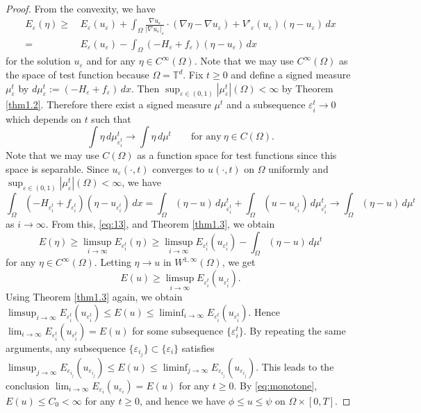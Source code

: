 \documentclass{amsart}
\theoremstyle{definition}
\begin{document}
\begin{proof}
From the convexity, we have
\begin{equation}\label{eq:13}
\begin{split}
E_\varepsilon (\eta)
\geq & \,
E_\varepsilon (u_\varepsilon)
+ \int_{\Omega} \frac{\nabla u_\varepsilon}{|\nabla u_\varepsilon|_\varepsilon }
\cdot (\nabla \eta -\nabla u_\varepsilon)
+V' _\varepsilon (u_\varepsilon) (\eta -u_\varepsilon) \, dx \\
=& \,
E_\varepsilon (u_\varepsilon)
- \int_{\Omega} (-H_\varepsilon +f_\varepsilon ) (\eta -u_\varepsilon) \, dx
\end{split}
\end{equation}
for the solution $u_\varepsilon$ and for any $\eta \in C^\infty (\Omega)$.
Note that we may use $C^\infty (\Omega)$ as the space of test function because $\Omega =\mathbb{T}^d$.
Fix $t\geq 0$ and define a signed measure $\mu_\varepsilon ^t$
by $d\mu_\varepsilon ^t := (-H_\varepsilon +f_\varepsilon) \, dx$. Then $\sup_{\varepsilon \in (0,1)} |\mu_\varepsilon ^t|(\Omega) <\infty$ by Theorem \ref{thm1.2}.
Therefore there exist a signed measure $\mu ^t$
and a subsequence $\varepsilon_i ^t \to 0$ 
which depends on $t$ such that 
\[
\int \eta \, d\mu_{\varepsilon_i ^t} ^t 
\to \int \eta \, d\mu ^t
\qquad 
\text{for any} \ \eta \in C(\Omega).
\]
Note that we may use $C(\Omega)$ 
as a function space for test functions since this space is separable.
Since $u_\varepsilon (\cdot,t)$ converges to $u (\cdot,t)$ on $\Omega$ uniformly and 
$\sup_{\varepsilon \in (0,1)} |\mu_\varepsilon ^t|(\Omega) <\infty$, 
we have
\[
\int_{\Omega} (-H_{\varepsilon_i ^t} +f_{\varepsilon_i ^t} ) (\eta -u_{\varepsilon_i ^t}) \, dx
=
\int_{\Omega} (\eta -u) \, d\mu_{\varepsilon_i ^t} ^t
+
\int_{\Omega} (u-u_{\varepsilon_i ^t}) \, d\mu_{\varepsilon_i ^t} ^t
\to 
\int_{\Omega} (\eta -u) \, d\mu ^t
\]
as $i \to \infty$. From this, \eqref{eq:13}, and Theorem \ref{thm1.3}, we obtain
\[
E (\eta) \geq \limsup_{i\to \infty} E_{\varepsilon_i ^t } (\eta)
\geq \limsup_{i\to \infty} E_{\varepsilon_i ^t} (u_{\varepsilon_i ^t})
-\int_\Omega (\eta -u) \, d\mu^t
\]
for any $\eta \in C^\infty (\Omega)$.
Letting $\eta \to u$ in $W^{1,\infty}(\Omega)$, 
we get 
\[
E(u) \geq \limsup_{i\to \infty} E_{\varepsilon_i ^t} (u_{\varepsilon_i ^t}).
\]
Using Theorem \ref{thm1.3} again, we obtain
$\limsup_{i\to \infty} E_{\varepsilon_i ^t} (u_{\varepsilon_i ^t})\leq E(u) \leq \liminf_{i\to \infty} E_{\varepsilon_i ^t} (u_{\varepsilon_i ^t})$. Hence
$\lim_{i\to \infty} E_{\varepsilon_i ^t} (u_{\varepsilon_i ^t}) =E (u)$ for some subsequence $\{\varepsilon_i ^t\}$.
By repeating the same arguments, any subsequence $\{ \varepsilon _{i_j} \} \subset \{ \varepsilon_i \}$ satisfies
$\limsup_{j\to \infty} E_{\varepsilon_{i_j} } (u_{\varepsilon_{i_j}})\leq E(u) \leq \liminf_{j\to \infty} E_{\varepsilon_{i_j}} (u_{\varepsilon_{i_j}})$. 
This leads to the conclusion $\lim_{i\to \infty} E_{\varepsilon_i} (u_{\varepsilon_i}) =E (u)$ for any $t\geq 0$.
By \eqref{eq:monotone}, $E(u)\leq C_0 <\infty$ for any $t\geq 0$, and hence we have $\phi \leq u\leq \psi$ on $\Omega \times [0,T]$.
\end{proof}
\end{document}
